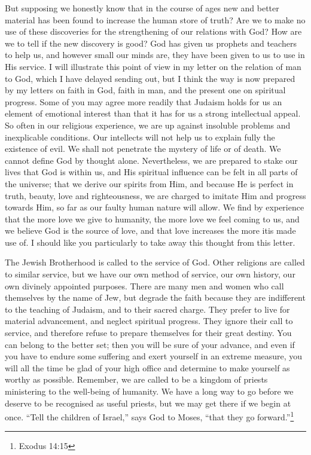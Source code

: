 But supposing we honestly know that in the course of
ages new and better material has been found to increase the
human store of truth? Are we to make no use of these discoveries
for the strengthening of our relations with God?
How are we to tell if the new discovery is good? God has
given us prophets and teachers to help us, and however
small our minds are, they have been given to us to use in
His service. I will illustrate this point of view in my
letter on the relation of man to God, which I have delayed
sending out, but I think the way is now prepared by my
letters on faith in God, faith in man, and the present one
on spiritual progress. Some of you may agree more readily
that Judaism holds for us an element of emotional interest
than that it has for us a strong intellectual appeal. So
often in our religious experience, we are up against
insoluble problems and inexplicable conditions. Our
intellects will not help us to explain fully the existence
of evil. We shall not penetrate the mystery of life or of
death. We cannot define God by thought alone. Nevertheless,
we are prepared to stake our lives that God is within
us, and His spiritual influence can be felt in all parts of
the universe; that we derive our spirits from Him, and
because He is perfect in truth, beauty, love and righteousness,
we are charged to imitate Him and progress towards
Him, so far as our faulty human nature will allow. We find
by experience that the more love we give to humanity, the
more love we feel coming to us, and we believe God is the
source of love, and that love increases the more itis made
use of. I should like you particularly to take away this
thought from this letter.

The Jewish Brotherhood is called to the service of
God. Other religions are called to similar service, but we
have our own method of service, our own history, our own
divinely appointed purposes. There are many men and women
who call themselves by the name of Jew, but degrade the
faith because they are indifferent to the teaching of
Judaism, and to their sacred charge. They prefer to live
for material advancement, and neglect spiritual progress.
They ignore their call to service, and therefore refuse to
prepare themselves for their great destiny. You can belong
to the better set; then you will be sure of your advance,
and even if you have to endure some suffering and exert
yourself in an extreme measure, you will all the time be
glad of your high office and determine to make yourself as
worthy as possible. Remember, we are called to be a
kingdom of priests ministering to the well-being of
humanity. We have a long way to go before we deserve to be
recognised as useful priests, but we may get there if we
begin at once. ``Tell the children of Israel,'' says God to
Moses, ``that they go forward.''\footnote{Exodus 14:15}


